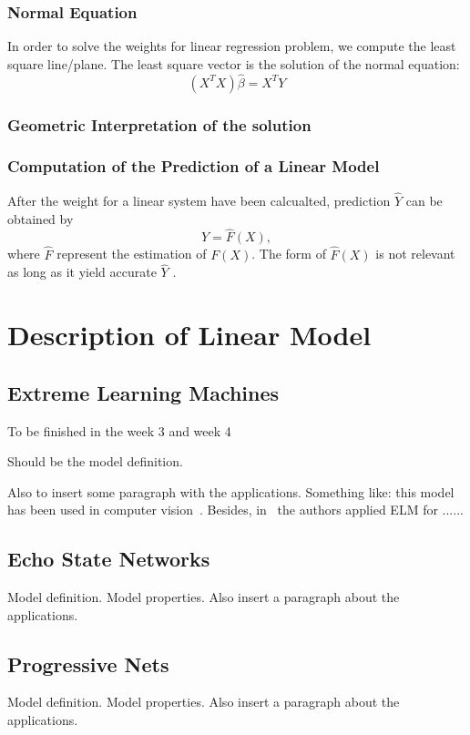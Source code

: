 \documentclass[11pt]{article}
\newcommand{\msb}[1]{{\color{blue}#1}}
\begin{document}
\subsubsection{Normal Equation}
In order to solve the weights for linear regression problem, we compute the least square line/plane. The least square vector is the solution of the normal equation:
\begin{equation*}
(X^TX)\hat{\beta} = X^TY
\end{equation*}
\subsubsection{Geometric Interpretation of the solution}

\subsubsection{Computation of the Prediction of a Linear Model}
After the weight for a linear system have been calcualted, prediction $\hat{Y}$ can be obtained by
\begin{equation*}
\hat{Y} = \hat{F}(X),
\end{equation*}
where $\hat{F}$ represent the estimation of $F(X)$. The form of $\hat{F}(X)$ is not relevant as long as it yield accurate $\hat{Y}$ \cite [p. 19] {james_introduction_2013}.
\section{Description of Linear Model}

\subsection{Extreme Learning Machines}
\msb{To be finished in the week 3 and week 4}

Should be the model definition.

Also to insert some paragraph with the applications. Something like: this model has been used in computer vision~\cite{.....}. Besides, in~\cite{} the authors applied ELM for ......

\subsection{Echo State Networks}
Model definition.
Model properties.
Also insert a paragraph about the applications.

\subsection{Progressive Nets}
Model definition.
Model properties.
Also insert a paragraph about the applications.
\end{document}

